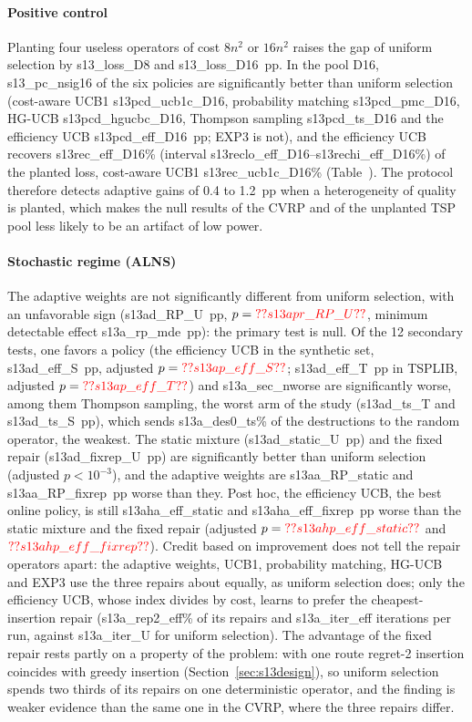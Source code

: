\paragraph{Positive control} Planting four useless operators of cost $8n^2$ or $16n^2$ raises the gap of uniform selection by \num{s13_loss_D8} and \num{s13_loss_D16}~pp. In the pool D16, \num{s13_pc_nsig16} of the six policies are significantly better than uniform selection (cost-aware UCB1 \num{s13pcd_ucb1c_D16}, probability matching \num{s13pcd_pmc_D16}, HG-UCB \num{s13pcd_hgucbc_D16}, Thompson sampling \num{s13pcd_ts_D16} and the efficiency UCB \num{s13pcd_eff_D16}~pp; EXP3 is not), and the efficiency UCB recovers \num{s13rec_eff_D16}\% (interval \num{s13reclo_eff_D16}--\num{s13rechi_eff_D16}\%) of the planted loss, cost-aware UCB1 \num{s13rec_ucb1c_D16}\% (Table~). The protocol therefore detects adaptive gains of 0.4 to 1.2~pp when a heterogeneity of quality is planted, which makes the null results of the CVRP and of the unplanted TSP pool less likely to be an artifact of low power.



\paragraph{Stochastic regime (ALNS)} The adaptive weights are not significantly different from uniform selection, with an unfavorable sign (\num{s13ad_RP_U}~pp, $p=\num{s13apr_RP_U}$, minimum detectable effect \num{s13a_rp_mde}~pp): the primary test is null. Of the 12 secondary tests, one favors a policy (the efficiency UCB in the synthetic set, \num{s13ad_eff_S}~pp, adjusted $p=\num{s13ap_eff_S}$; \num{s13ad_eff_T}~pp in TSPLIB, adjusted $p=\num{s13ap_eff_T}$) and \num{s13a_sec_nworse} are significantly worse, among them Thompson sampling, the worst arm of the study (\num{s13ad_ts_T} and \num{s13ad_ts_S}~pp), which sends \num{s13a_des0_ts}\% of the destructions to the random operator, the weakest. The static mixture (\num{s13ad_static_U}~pp) and the fixed repair (\num{s13ad_fixrep_U}~pp) are significantly better than uniform selection (adjusted $p<10^{-3}$), and the adaptive weights are \num{s13aa_RP_static} and \num{s13aa_RP_fixrep}~pp worse than they. Post hoc, the efficiency UCB, the best online policy, is still \num{s13aha_eff_static} and \num{s13aha_eff_fixrep}~pp worse than the static mixture and the fixed repair (adjusted $p=\num{s13ahp_eff_static}$ and $\num{s13ahp_eff_fixrep}$). Credit based on improvement does not tell the repair operators apart: the adaptive weights, UCB1, probability matching, HG-UCB and EXP3 use the three repairs about equally, as uniform selection does; only the efficiency UCB, whose index divides by cost, learns to prefer the cheapest-insertion repair (\num{s13a_rep2_eff}\% of its repairs and \num{s13a_iter_eff} iterations per run, against \num{s13a_iter_U} for uniform selection). The advantage of the fixed repair rests partly on a property of the problem: with one route regret-2 insertion coincides with greedy insertion (Section~\ref{sec:s13design}), so uniform selection spends two thirds of its repairs on one deterministic operator, and the finding is weaker evidence than the same one in the CVRP, where the three repairs differ.

